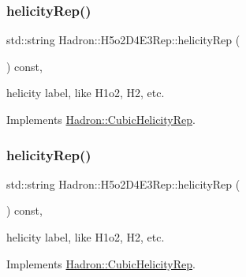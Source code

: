\mbox{\label{structHadron_1_1H5o2D4E3Rep_a71af11dde163357e0254fa7736f41250}} 
\subsubsection{\texorpdfstring{helicityRep()}{helicityRep()}\hspace{0.1cm}{\footnotesize\ttfamily [1/2]}}
{\footnotesize\ttfamily std\+::string Hadron\+::\+H5o2\+D4\+E3\+Rep\+::helicity\+Rep (\begin{DoxyParamCaption}{ }\end{DoxyParamCaption}) const\hspace{0.3cm}{\ttfamily [inline]}, {\ttfamily [virtual]}}

helicity label, like H1o2, H2, etc. 

Implements \mbox{\hyperlink{structHadron_1_1CubicHelicityRep_af1096946b7470edf0a55451cc662f231}{Hadron\+::\+Cubic\+Helicity\+Rep}}.

\mbox{\label{structHadron_1_1H5o2D4E3Rep_a71af11dde163357e0254fa7736f41250}} 
\subsubsection{\texorpdfstring{helicityRep()}{helicityRep()}\hspace{0.1cm}{\footnotesize\ttfamily [2/2]}}
{\footnotesize\ttfamily std\+::string Hadron\+::\+H5o2\+D4\+E3\+Rep\+::helicity\+Rep (\begin{DoxyParamCaption}{ }\end{DoxyParamCaption}) const\hspace{0.3cm}{\ttfamily [inline]}, {\ttfamily [virtual]}}

helicity label, like H1o2, H2, etc. 

Implements \mbox{\hyperlink{structHadron_1_1CubicHelicityRep_af1096946b7470edf0a55451cc662f231}{Hadron\+::\+Cubic\+Helicity\+Rep}}.

\mbox{\label{structHadron_1_1H5o2D4E3Rep_ab2c75db69668bb5a4d127992c3441ea4}} 
